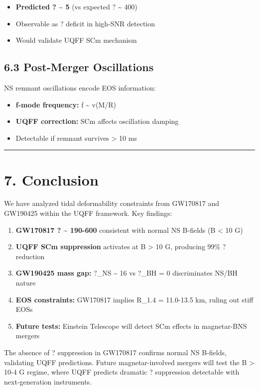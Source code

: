 \documentclass[11pt]{article}
\begin{document}
\begin{itemize}
  \item \textbf{Predicted ? \textasciitilde{} 5} (vs expected ? \textasciitilde{} 400)
  \item Observable as ? deficit in high-SNR detection
  \item Would validate UQFF SCm mechanism
\end{itemize}

\subsection*{6.3 Post-Merger Oscillations}

NS remnant oscillations encode EOS information:

\begin{itemize}
  \item \textbf{f-mode frequency:} f \textasciitilde{} v(M/R)
  \item \textbf{UQFF correction:} SCm affects oscillation damping
  \item Detectable if remnant survives > 10 ms
\end{itemize}

\noindent\rule{\textwidth}{0.4pt}

\section*{7. Conclusion}

We have analyzed tidal deformability constraints from GW170817 and GW190425 within the UQFF framework. Key findings:

\begin{enumerate}
  \item \textbf{GW170817 ? \textasciitilde{} 190-600} consistent with normal NS B-fields (B < 10 G)
  \item \textbf{UQFF SCm suppression} activates at B > 10 G, producing 99\% ? reduction
  \item \textbf{GW190425 mass gap:} ?\_NS \textasciitilde{} 16 vs ?\_BH = 0 discriminates NS/BH nature
  \item \textbf{EOS constraints:} GW170817 implies R\_1.4 = 11.0-13.5 km, ruling out stiff EOSs
  \item \textbf{Future tests:} Einstein Telescope will detect SCm effects in magnetar-BNS mergers
\end{enumerate}

The absence of ? suppression in GW170817 confirms normal NS B-fields, validating UQFF predictions. Future magnetar-involved mergers will test the B > 10-4 G regime, where UQFF predicts dramatic ? suppression detectable with next-generation instruments.
\end{document}
